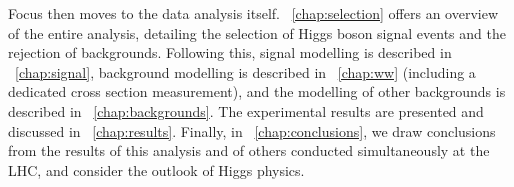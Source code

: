 Focus then moves to the data analysis itself. \Chapter~\ref{chap:selection} offers an 
overview of the entire \HWW analysis, detailing the selection of Higgs boson signal events 
and the rejection of backgrounds. Following this, signal modelling is described in 
\Chapter~\ref{chap:signal}, \WW background modelling is described in \Chapter~\ref{chap:ww} 
(including a dedicated cross section measurement), and the modelling of other backgrounds is 
described in \Chapter~\ref{chap:backgrounds}. The experimental results are presented and 
discussed in \Chapter~\ref{chap:results}. Finally, in \Chapter~\ref{chap:conclusions}, we 
draw conclusions from the results of this analysis and of others conducted simultaneously at 
the LHC, and consider the outlook of Higgs physics.
